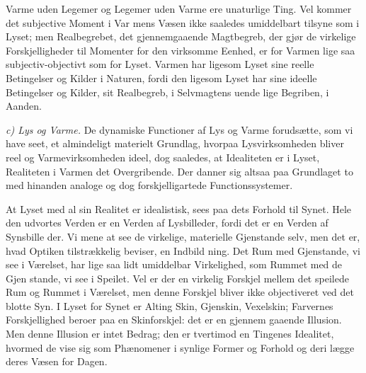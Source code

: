 \documentclass[12pt,a4paper]{book}
\newcommand{\runin}[1]{\emph{#1}\hspace{0.4em}}
\begin{document}
Varme uden Legemer og Legemer uden Varme ere
unaturlige Ting. Vel kommer det subjective Moment i Var\-%
mens Væsen ikke saaledes umiddelbart tilsyne som i Lyset; men
Realbegrebet, det gjennemgaaende Magtbegreb, der gjør de virkelige
Forskjelligheder til Momenter for den virksomme Eenhed, er for Varmen
lige saa subjectiv-objectivt som for Lyset. Varmen har ligesom Lyset
sine reelle Betingelser og Kilder i Naturen, fordi den ligesom Lyset
har sine ideelle Betingelser og Kilder, sit Realbegreb, i Selvmagtens
uende\-%
lige Begriben, i Aanden.

\runin{c) Lys og Varme.} De dynamiske Functioner af Lys og Varme
forudsætte, som vi have seet, et almindeligt materielt Grundlag,
hvorpaa Lysvirksomheden bliver reel og Varmevirksomheden ideel, dog
saaledes, at Idealiteten er i Lyset, Realiteten i Varmen det
Overgribende. Der danner sig altsaa paa Grundlaget to med hinanden
analoge og dog forskjelligartede Functionssystemer.

At Lyset med al sin Realitet er idealistisk, sees paa dets Forhold til
Synet. Hele den udvortes Verden er en Verden af Lysbilleder, fordi det
er en Verden af Synsbille\-%
der. Vi mene at see de virkelige, materielle Gjenstande selv, men det
er, hvad Optiken tilstrækkelig beviser, en Indbild\-%
ning. Det Rum med Gjenstande, vi see i Værelset, har lige saa lidt
umiddelbar Virkelighed, som Rummet med de Gjen\-%
stande, vi see i Speilet. Vel er der en virkelig Forskjel mellem det
speilede Rum og Rummet i Værelset, men denne Forskjel bliver ikke
objectiveret ved det blotte Syn. I Lyset for Synet er Alting Skin,
Gjenskin, Vexelskin; Farvernes Forskjellighed beroer paa en
Skinforskjel: det er en gjennem\-%
gaaende Illusion. Men denne Illusion er intet Bedrag; den er tvertimod
en Tingenes Idealitet, hvormed de vise sig som Phænomener i synlige
Former og Forhold og deri lægge deres Væsen for Dagen.
\end{document}
